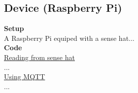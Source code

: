 \subsection{Device (Raspberry Pi)}
\textbf{Setup}\\
A Raspberry Pi equiped with a sense hat...\\

\noindent\textbf{Code}\\
\underline{Reading from sense hat}\\
...\\
\underline{Using MQTT}\\
...
